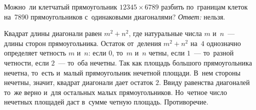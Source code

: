 \problem
Можно~ли клетчатый прямоугольник $12345 \times 6789$ разбить по~границам клеток
на~7890 прямоугольников с~одинаковыми диагоналями?
\solution
\emph{Ответ:} нельзя.
\par
Квадрат длины диагонали равен $m^2 + n^2$, где натуральные числа $m$ и~$n$~---
длины сторон прямоугольника.
Остаток от~деления $m^2 + n^2$ на~$4$ однозначно определяет четность $m$ и~$n$:
если $0$, то~$m$ и~$n$ четны, если $1$~--- то~разной четности, если $2$~---
то~оба нечетны.
Так как площадь большого прямоугольника нечетна, то~есть и~малый прямоугольник
нечетной площади.
В~нем стороны нечетны, значит, квадрат диагонали дает остаток $2$.
Ввиду равенства диагоналей то~же верно и~для остальных малых прямоугольников.
Но~четное число нечетных площадей даст в~сумме четную площадь.
Противоречие.
\endproblem
